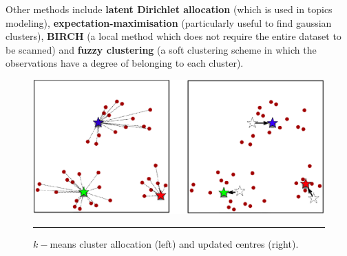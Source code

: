 Other methods include \textbf{latent Dirichlet allocation} (which is used in topics modeling), \textbf{expectation-maximisation} (particularly useful to find gaussian clusters), \textbf{BIRCH} (a local method which does not require the entire dataset to be scanned) and \textbf{fuzzy clustering} (a soft clustering scheme in which the observations have a degree of belonging to each cluster). 
\begin{figure}[!t]
\centering
\includegraphics[width=\textwidth]{images/DSML/clustering5.png}
\caption[\small $k-$means cluster allocation and updated centres.]{\small $k-$means cluster allocation (left) and updated centres (right).}\hrule\label{fig:clust5}
\end{figure}
\afterpage{\FloatBarrier}
